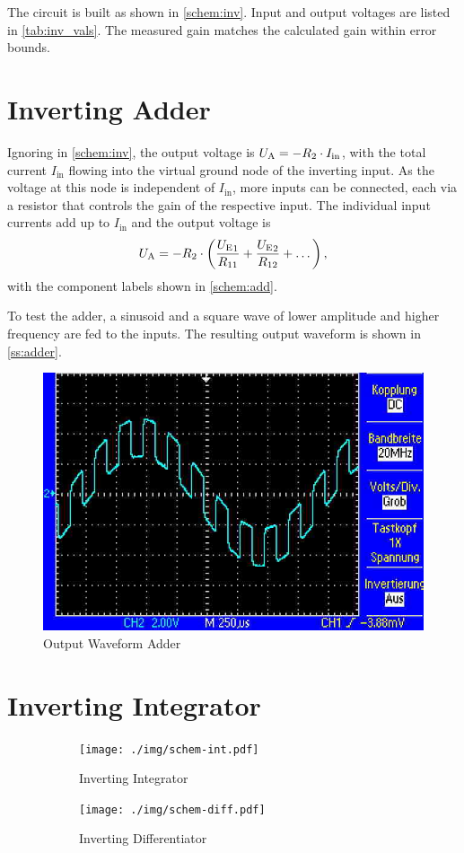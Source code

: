 The circuit is built as shown in \autoref{schem:inv}.
Input and output voltages are listed in \autoref{tab:inv_vals}.
The measured gain matches the calculated gain within error bounds.

\section{Inverting Adder}

Ignoring  in \autoref{schem:inv}, the output voltage \ua is $U_\text{A} = -R_2 \cdot I_\text{in}$, with the total current $I_\text{in}$ flowing into the virtual ground node of the inverting input.
As the voltage at this node is independent of $I_\text{in}$, more inputs can be connected, each via a resistor that controls the gain of the respective input.
The individual input currents add up to $I_\text{in}$ and the output voltage is \[U_\text{A} = -R_2 \cdot \left(\frac{{U_\text{E}}_1}{R_{11}} + \frac{{U_\text{E}}_2}{R_{12}} + \dots\right),\] with the component labels shown in \autoref{schem:add}.

To test the adder, a sinusoid and a square wave of lower amplitude and higher frequency are fed to the inputs.
The resulting output waveform is shown in \autoref{ss:adder}.

\begin{figure}
	\centering
	\includegraphics[width=.4\linewidth]{./img/ss-adder}
	\caption{Output Waveform Adder}
	\label{ss:adder}
\end{figure}

\section{Inverting Integrator}

\begin{figure}
	\centering
	\begin{subfigure}{0.4\textwidth}
		\centering
		\texttt{[image: ./img/schem-int.pdf]}
		\caption{Inverting Integrator}
		\label{schem:int}
	\end{subfigure}
	\begin{subfigure}{0.4\textwidth}
		\centering
		\texttt{[image: ./img/schem-diff.pdf]}
		\caption{Inverting Differentiator}
		\label{schem:diff}
	\end{subfigure}
	\caption[Schematics of Integrator and Differentiator]{}
\end{figure}

